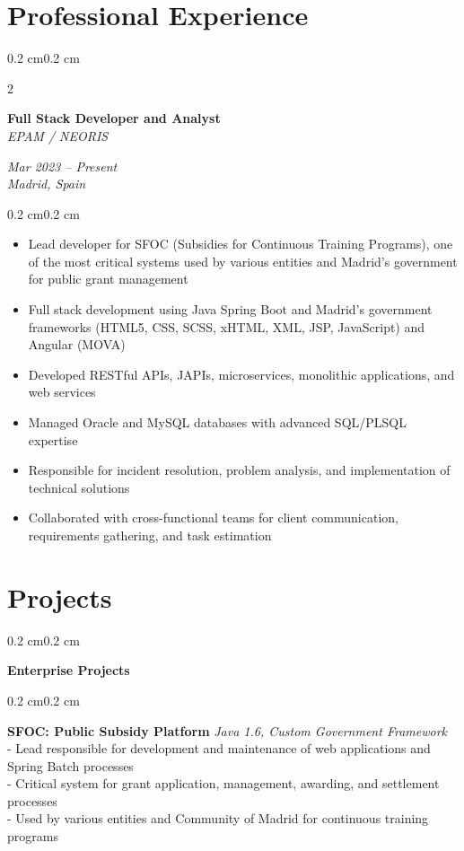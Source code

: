 \documentclass[10pt, letterpaper]{article}
\newenvironment{highlights}{
    \begin{itemize}[
        topsep=0.10 cm,
        parsep=0.10 cm,
        partopsep=0pt,
        itemsep=0pt,
        leftmargin=0.4 cm + 10pt
    ]
}{
    \end{itemize}
}
\newenvironment{onecolentry}{
    \begin{adjustwidth}{0.2 cm}{0.2 cm}
}{
    \end{adjustwidth}
}
\newenvironment{twocolentry}[2][]{
    \onecolentry
    \def\secondColumn{#2}
    \setcolumnwidth{\fill, 4.5 cm}
    \begin{paracol}{2}
}{
    \switchcolumn \raggedleft \secondColumn
    \end{paracol}
    \endonecolentry
}
\begin{document}
    \section{Professional Experience}
    \begin{twocolentry}{\textit{Mar 2023 -- Present}\\\textit{Madrid, Spain}}
        \textbf{Full Stack Developer and Analyst} \\
        \textit{EPAM / NEORIS}
    \end{twocolentry}
    \begin{onecolentry}
        \begin{highlights}
            \item Lead developer for SFOC (Subsidies for Continuous Training Programs), one of the most critical systems used by various entities and Madrid's government for public grant management
            \item Full stack development using Java Spring Boot and Madrid's government frameworks (HTML5, CSS, SCSS, xHTML, XML, JSP, JavaScript) and Angular (MOVA)
            \item Developed RESTful APIs, JAPIs, microservices, monolithic applications, and web services
            \item Managed Oracle and MySQL databases with advanced SQL/PLSQL expertise
            \item Responsible for incident resolution, problem analysis, and implementation of technical solutions
            \item Collaborated with cross-functional teams for client communication, requirements gathering, and task estimation
        \end{highlights}
    \end{onecolentry}

    \section{Projects}
    
    \begin{onecolentry}
        \textbf{Enterprise Projects}
    \end{onecolentry}

    \begin{onecolentry}
        \textbf{SFOC: Public Subsidy Platform} \hfill \textit{Java 1.6, Custom Government Framework} \\
        - Lead responsible for development and maintenance of web applications and Spring Batch processes \\
        - Critical system for grant application, management, awarding, and settlement processes \\
        - Used by various entities and Community of Madrid for continuous training programs
    \end{onecolentry}
    
\end{document}
